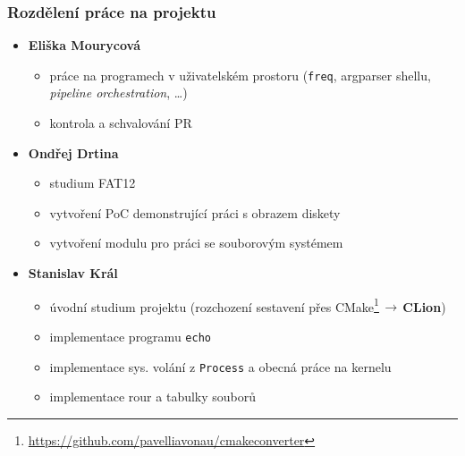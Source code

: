 \documentclass[xcolor=dvipsnames]{beamer}
\begin{document}
\begin{frame}
\frametitle{Rozdělení práce na projektu}
    \begingroup
    \small
	\begin{itemize}
        \setlength\itemsep{0.1em}
        \item \textbf{Eliška Mourycová}
        \begin{itemize}
            \setlength\itemsep{0.1em}
            \item práce na programech v uživatelském prostoru (\texttt{freq}, argparser shellu, \textit{pipeline orchestration}, \ldots)
            \item kontrola a schvalování PR
        \end{itemize}
        \item \textbf{Ondřej Drtina}
        \begin{itemize}
            \setlength\itemsep{0.1em}
            \item studium FAT12 
            \item vytvoření PoC demonstrující práci s obrazem diskety
            \item vytvoření modulu pro práci se souborovým systémem
        \end{itemize}
        \item \textbf{Stanislav Král}
        \begin{itemize}
            \setlength\itemsep{0.1em}
            \item úvodní studium projektu (rozchození sestavení přes CMake\footnote{\url{https://github.com/pavelliavonau/cmakeconverter}}$\,\to\,$\textbf{CLion})
            \item implementace programu \texttt{echo}
            \item implementace sys. volání z \texttt{Process} a obecná práce na kernelu
            \item implementace rour a tabulky souborů
        \end{itemize}
  	\end{itemize}
    \endgroup
\end{frame}
\end{document}
